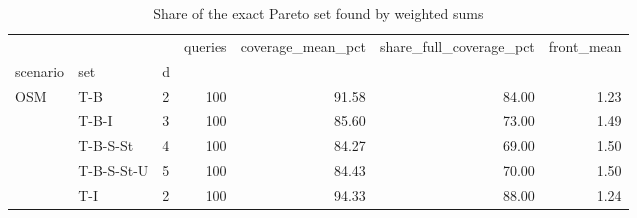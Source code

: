 \begin{table}
\caption{Share of the exact Pareto set found by weighted sums}
\label{tab:T4_weighted_sum_coverage}
\begin{tabular}{lllrrrr}
\toprule
 &  &  & queries & coverage_mean_pct & share_full_coverage_pct & front_mean \\
scenario & set & d &  &  &  &  \\
\midrule
\multirow[t]{5}{*}{OSM} & T-B & 2 & 100 & 91.58 & 84.00 & 1.23 \\
\cline{2-7}
 & T-B-I & 3 & 100 & 85.60 & 73.00 & 1.49 \\
\cline{2-7}
 & T-B-S-St & 4 & 100 & 84.27 & 69.00 & 1.50 \\
\cline{2-7}
 & T-B-S-St-U & 5 & 100 & 84.43 & 70.00 & 1.50 \\
\cline{2-7}
 & T-I & 2 & 100 & 94.33 & 88.00 & 1.24 \\
\cline{1-7} \cline{2-7}
\bottomrule
\end{tabular}
\end{table}
